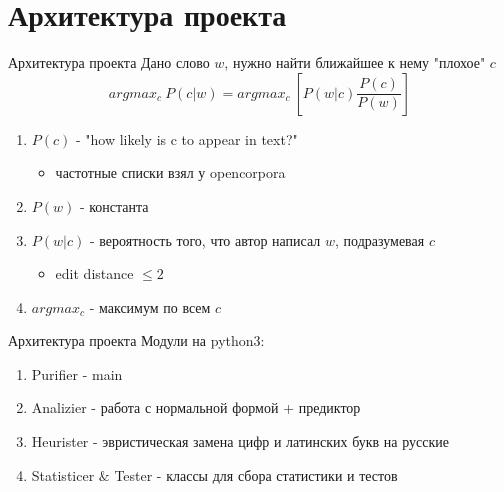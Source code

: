 \documentclass{beamer}
\begin{document}
\section{Архитектура проекта}
\begin{frame}[t]{Архитектура проекта}
    Дано слово $w$, нужно найти ближайшее к нему "плохое" $c$
    $$argmax_c ~ {P(c|w)} = argmax_c ~ \left[ {P(w|c) \frac{P(c)}{P(w)}} \right]$$
    \begin{enumerate}
        \item $P(c)$ - "how likely is c to appear in text?"
            \begin{itemize}
                \item частотные списки взял у opencorpora
            \end{itemize}
        \item $P(w)$ - константа
        \item $P(w|c)$ - вероятность того, что автор написал $w$, подразумевая $c$
            \begin{itemize}
                \item edit distance $\leqslant 2$
            \end{itemize}
        \item $argmax_c$ - максимум по всем $c$
    \end{enumerate}
\end{frame}
\begin{frame}[t]{Архитектура проекта}
    Модули на python3:
    \begin{enumerate}
        \item Purifier - main
        \item Analizier - работа с нормальной формой + предиктор
        \item Heurister - эвристическая замена цифр и латинских букв на русские
        \item Statisticer $\&$ Tester - классы для сбора статистики и тестов
    \end{enumerate}
\end{frame}
\end{document}
